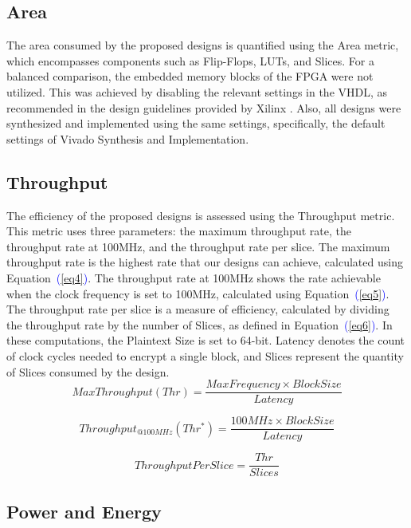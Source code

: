 \documentclass[final,5p,times,twocolumn]{elsarticle}
\begin{document}
\subsection{Area}\label{subsec5}

The area consumed by the proposed designs is quantified using the Area metric, which encompasses components such as Flip-Flops, LUTs, and Slices.
For a balanced comparison, the embedded memory blocks of the FPGA were not utilized.
This was achieved by disabling the relevant settings in the VHDL, as recommended in the design guidelines provided by Xilinx \cite{xilinx2022ultrafast}.
Also, all designs were synthesized and implemented using the same settings, specifically, the default settings of Vivado Synthesis and Implementation.

\subsection{Throughput}\label{subsec6}
The efficiency of the proposed designs is assessed using the Throughput metric.
This metric uses three parameters: the maximum throughput rate, the throughput rate at 100MHz, and the throughput rate per slice.
The maximum throughput rate is the highest rate that our designs can achieve, calculated using Equation~\textcolor{blue}{(\ref{eq4})}.
The throughput rate at 100MHz shows the rate achievable when the clock frequency is set to 100MHz, calculated using Equation~\textcolor{blue}{(\ref{eq5})}.
The throughput rate per slice is a measure of efficiency, calculated by dividing the throughput rate by the number of Slices, as defined in Equation~\textcolor{blue}{(\ref{eq6})}.
In these computations, the Plaintext Size is set to 64-bit.
Latency denotes the count of clock cycles needed to encrypt a single block, and Slices represent the quantity of Slices consumed by the design.
\begin{equation}
    MaxThroughput(Thr) = \frac{MaxFrequency \times Block Size}{Latency}
    \label{eq4}
\end{equation}

\begin{equation}
    Throughput_{@100MHz}(Thr^*) = \frac{100MHz \times Block Size}{Latency}
    \label{eq5}
\end{equation}

\begin{equation}
    ThroughputPerSlice = \frac{Thr}{Slices}
    \label{eq6}
\end{equation}

\subsection{Power and Energy}\label{power_energy}
\end{document}
